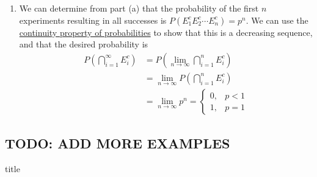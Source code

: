 \begin{changebar}
\begin{solution}
\begin{enumerate}[label=(\alph*)]
            \item We can determine from part (a) that the probability of the first $n$ experiments resulting in all successes is $P(E_1^cE_2^c\cdots E_n^c) = p^n$. We can use the \hyperref[limitequiv]{continuity property of probabilities} to show that this is a decreasing sequence, and that the desired probability is \[
                \begin{aligned}
                    P\left( \bigcap^\infty_{i = 1} E_i^c \right) &= P\left( \lim_{n \to \infty} \bigcap^n_{i = 1} E_i^c \right) \\
                    &= \lim_{n \to \infty} P\left( \bigcap^n_{i = 1} E_i^c \right) \\
                    &= \lim_{n \to \infty} p^n = \begin{cases}
                        0, & p < 1 \\
                        1, & p = 1
                    \end{cases}
                \end{aligned}    
            \]
        \end{enumerate}
    \end{solution}
\end{changebar}

\subsection{TODO: ADD MORE EXAMPLES}

title

\pagebreak
